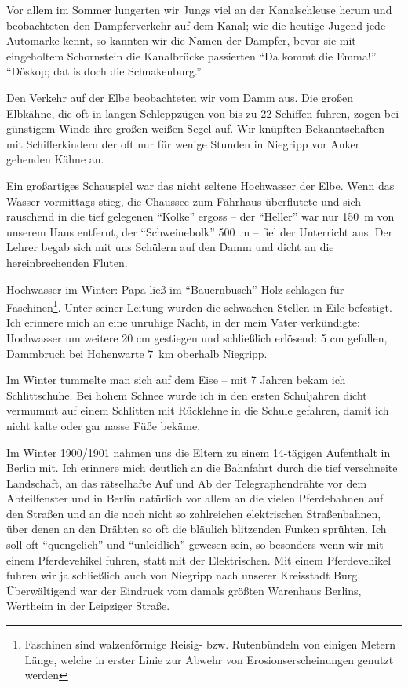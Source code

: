 \documentclass[a5paper,pagesize,10pt,twoside=true]{scrbook}
\begin{document}
Vor allem im Sommer lungerten wir Jungs viel an der Kanalschleuse herum und beobachteten den Dampferverkehr auf dem Kanal; wie die heutige Jugend jede Automarke kennt, so kannten wir die Namen der Dampfer, bevor sie mit eingeholtem Schornstein die Kanalbrücke passierten \enquote{Da kommt die Emma!} \enquote{Döskop; dat is doch die Schnakenburg.}

Den Verkehr auf der Elbe beobachteten wir vom Damm aus. Die großen Elbkähne, die oft in langen Schleppzügen von bis zu 22 Schiffen fuhren, zogen bei günstigem Winde ihre großen weißen Segel auf. Wir knüpften Bekanntschaften mit Schifferkindern der oft nur für wenige Stunden in Niegripp vor Anker gehenden Kähne an.

Ein großartiges Schauspiel war das nicht seltene Hochwasser der Elbe. Wenn das Wasser vormittags stieg, die Chaussee zum Fährhaus überflutete und sich rauschend in die tief gelegenen \enquote{Kolke} ergoss -- der \enquote{Heller} war nur 150~m von unserem Haus entfernt, der \enquote{Schweinebolk} 500~m -- fiel der Unterricht aus. Der Lehrer begab sich mit uns Schülern auf den Damm und dicht an die hereinbrechenden Fluten.

Hochwasser im Winter: Papa ließ im \enquote{Bauernbusch} Holz schlagen für Faschinen\footnote{Faschinen sind walzenförmige Reisig- bzw. Rutenbündeln von einigen Metern Länge, welche in erster Linie zur Abwehr von Erosionserscheinungen genutzt werden}. Unter seiner Leitung wurden die schwachen Stellen in Eile befestigt. Ich erinnere mich an eine unruhige Nacht, in der mein Vater verkündigte: Hochwasser um weitere 20 cm gestiegen und schließlich erlösend: 5 cm gefallen, Dammbruch bei Hohenwarte 7~km oberhalb Niegripp.

Im Winter tummelte man sich auf dem Eise -- mit 7 Jahren bekam ich Schlittschuhe. Bei hohem Schnee wurde ich in den ersten Schuljahren dicht vermummt auf einem Schlitten mit Rücklehne in die Schule gefahren, damit ich nicht kalte oder gar nasse Füße bekäme.

Im Winter 1900/1901 nahmen uns die Eltern zu einem 14-tägigen Aufenthalt in Berlin mit. Ich erinnere mich deutlich an die Bahnfahrt durch die tief verschneite Landschaft, an das rätselhafte Auf und Ab der Telegraphendrähte vor dem Abteilfenster und in Berlin natürlich vor allem an die vielen Pferdebahnen auf den Straßen und an die noch nicht so zahlreichen elektrischen Straßenbahnen, über denen an den Drähten so oft die bläulich blitzenden Funken sprühten. Ich soll oft \enquote{quengelich} und \enquote{unleidlich} gewesen sein, so besonders wenn wir mit einem Pferdevehikel fuhren, statt mit der Elektrischen. Mit einem Pferdevehikel fuhren wir ja schließlich auch von Niegripp nach unserer Kreisstadt Burg. Überwältigend war der Eindruck vom damals größten Warenhaus Berlins, Wertheim in der Leipziger Straße.
\end{document}
